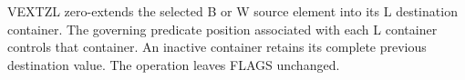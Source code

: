 VEXTZL zero-extends the selected B or W source element into its L destination
container.  The governing predicate position associated with each L container
controls that container.  An inactive container retains its complete previous
destination value.  The operation leaves FLAGS unchanged.
